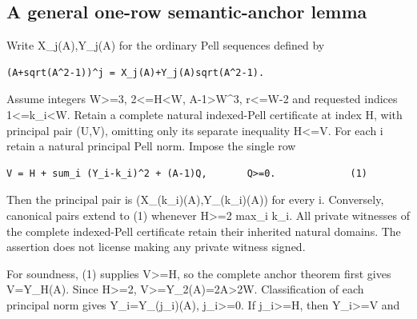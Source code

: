 \subsection{A general one-row semantic-anchor lemma}



Write X\_\allowbreak{}j(A),Y\_\allowbreak{}j(A) for the ordinary Pell sequences defined by



\begin{verbatim}
(A+sqrt(A^2-1))^j = X_j(A)+Y_j(A)sqrt(A^2-1).
\end{verbatim}

Assume integers W\textgreater{}\allowbreak{}=\allowbreak{}3, 2\textless{}\allowbreak{}=\allowbreak{}H\textless{}\allowbreak{}W, A-1\textgreater{}\allowbreak{}W\textasciicircum{}\allowbreak{}3, r\textless{}\allowbreak{}=\allowbreak{}W-2 and requested indices 1\textless{}\allowbreak{}=\allowbreak{}k\_\allowbreak{}i\textless{}\allowbreak{}W. Retain a complete natural indexed-Pell certificate at index H, with principal pair (U,V), omitting only its separate inequality H\textless{}\allowbreak{}=\allowbreak{}V. For each i retain a natural principal Pell norm. Impose the single row



\begin{verbatim}
V = H + sum_i (Y_i-k_i)^2 + (A-1)Q,       Q>=0.             (1)
\end{verbatim}

Then the principal pair is (X\_\allowbreak{}(k\_\allowbreak{}i)(A),Y\_\allowbreak{}(k\_\allowbreak{}i)(A)) for every i. Conversely, canonical pairs extend to (1) whenever H\textgreater{}\allowbreak{}=\allowbreak{}2 max\_\allowbreak{}i k\_\allowbreak{}i. All private witnesses of the complete indexed-Pell certificate retain their inherited natural domains. The assertion does not license making any private witness signed.



For soundness, (1) supplies V\textgreater{}\allowbreak{}=\allowbreak{}H, so the complete anchor theorem first gives V=\allowbreak{}Y\_\allowbreak{}H(A). Since H\textgreater{}\allowbreak{}=\allowbreak{}2, V\textgreater{}\allowbreak{}=\allowbreak{}Y\_\allowbreak{}2(A)=\allowbreak{}2A\textgreater{}\allowbreak{}2W. Classification of each principal norm gives Y\_\allowbreak{}i=\allowbreak{}Y\_\allowbreak{}(j\_\allowbreak{}i)(A), j\_\allowbreak{}i\textgreater{}\allowbreak{}=\allowbreak{}0. If j\_\allowbreak{}i\textgreater{}\allowbreak{}=\allowbreak{}H, then Y\_\allowbreak{}i\textgreater{}\allowbreak{}=\allowbreak{}V and



